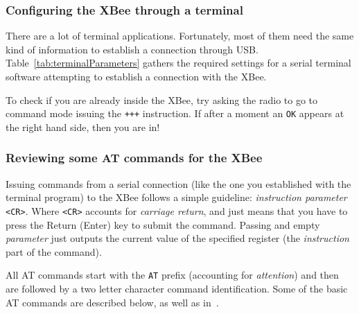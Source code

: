 \subsubsection{Configuring the XBee through a terminal }

There are a lot of terminal applications. Fortunately, most of them need the same kind of information to establish a connection through USB. Table~\ref{tab:terminalParameters} gathers the required settings for a serial terminal software attempting to establish a connection with the XBee.

\begin{table}[htbp]
	\centering
	\caption{Default terminal settings for establishing a connection with an XBee}
	\label{tab:terminalParameters}
\end{table}

To check if you are already inside the XBee, try asking the radio to go to command mode issuing the \texttt{+++} instruction. If after a moment an \texttt{OK} appears at the right hand side, then you are in!

\subsubsection{Reviewing some AT commands for the XBee}

Issuing commands from a serial connection (like the one you established with the terminal program) to the XBee follows a simple guideline: \emph{instruction parameter} \texttt{<CR>}. Where \texttt{<CR>} accounts for \emph{carriage return}, and just means that you have to press the Return (Enter) key to submit the command. Passing and empty \emph{parameter} just outputs the current value of the specified register (the \emph{instruction} part of the command).

All AT commands start with the \texttt{AT} prefix (accounting for \emph{attention}) and then are followed by a two letter character command identification. Some of the basic AT commands are described below, as well as in~\cite{faludi2010bws}.


